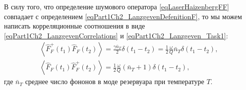 В силу того, что определение шумового оператора
\eqref{eqLaserHaizenbergFF} совпадает с
определением \eqref{eqPart1Ch2_LanzgevenDefenitionF}, то мы можем
написать корреляционные соотношения в виде
\eqref{eqPart1Ch2_LanzgevenCorrelations} и \eqref{eqPart1Ch2_Lanzgeven_Task1}:
\begin{eqnarray}
\left<\hat{F}_{F}^{+}\left(t_1\right)\hat{F}_{F}\left(t_2\right)\right> = 
\frac{\gamma \bar{n}_T}{2} \delta\left(t_1 - t_2\right) = 
\frac{1}{2}\frac{\omega}{Q}\bar{n}_T\delta\left(t_1 - t_2\right),
\nonumber \\
\left<\hat{F}_{F}\left(t_1\right)\hat{F}_{F}^{+}\left(t_2\right)\right> = 
\frac{1}{2}\frac{\omega}{Q}\left(\bar{n}_T + 1 \right)\delta\left(t_1 - t_2\right),
\label{eqLaserHaizenbergFFCorrel}
\end{eqnarray}
где $\bar{n}_T$ среднее число фононов в моде резервуара при
температуре $T$.
